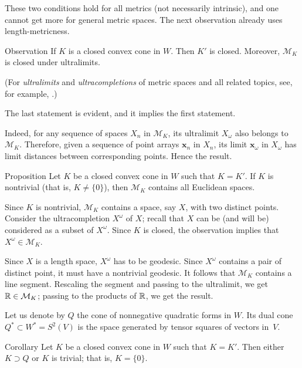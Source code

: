 \documentclass[a4paper,10pt]{article}
\begin{document}
These two conditions hold for all metrics (not necessarily intrinsic),
and one cannot get more for general metric spaces.
The next observation already uses length-metricness.

\begin{thm}{Observation}
If $K$ is a closed convex cone in $W$.
Then $K'$ is closed.
Moreover, $\mathcal{M}_K$ is closed under ultralimits.
\end{thm}


(For \emph{ultralimits} and \emph{ultracompletions} of metric spaces and all related topics, see, for example, \cite{petrunin2023}.)

The last statement is evident, and it implies the first statement.

Indeed, for any sequence of spaces $X_n$ in $\mathcal{M}_K$, its ultralimit $X_\omega$ also belongs to $\mathcal{M}_K$.
Therefore, given a sequence of point arrays $\bm{x}_n$ in $X_n$,
its limit $\bm{x}_\omega$ in $X_\omega$ has limit distances between corresponding points.
Hence the result.
\qeds

\begin{thm}{Proposition}\label{prop:Associated form}
Let $K$ be a closed convex cone in $W$ such that $K=K'$.
If $K$ is nontrivial (that is, $K\ne \{0\}$), then $\mathcal{M}_K$ contains all Euclidean spaces.
\end{thm}

Since $K$ is nontrivial, $\mathcal{M}_K$ contains a space, say $X$, with two distinct points.
Consider the ultracompletion $X^\omega$ of $X$;
recall that $X$ can be (and will be) considered as a subset of $X^\omega$.
Since $K$ is closed, the observation implies that $X^\omega\in \mathcal{M}_K$.

Since  $X$ is a length space, $X^\omega$ has to be geodesic.
Since $X^\omega$ contains a pair of distinct point, it must have a nontrivial geodesic.
It follows that $\mathcal{M}_K$ contains a line segment.
Rescaling the segment and passing to the ultralimit, we get $\mathbb{R}\in \mathcal{M}_K$;
passing to the products of $\mathbb{R}$, we get the result. 
\qeds

Let us denote by $Q$ the cone of nonnegative quadratic forms in $W$.
Its dual cone $Q^*\subset W^*=S^2(V)$ is the space generated by tensor squares of vectors in~$V$.

\begin{thm}{Corollary}
Let $K$ be a closed convex cone in $W$ such that $K=K'$.
Then either $K\supset Q$ or $K$ is trivial; that is, $K=\{0\}$.
\end{thm}
\end{document}
